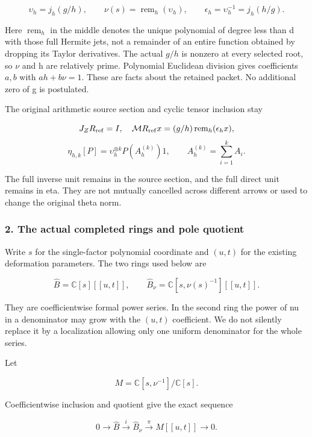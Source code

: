 \[
\upsilon_h=j_h(g/h),\qquad
\nu(s)=\operatorname{rem}_h(\upsilon_h),\qquad
\epsilon_h=\upsilon_h^{-1}=j_h(h/g).
\tag{UG2}
\]

Here \(\operatorname{rem}_h\) in the middle denotes the unique polynomial of degree less than d with those full Hermite jets, not a remainder of an entire function obtained by dropping its Taylor derivatives. The actual \(g/h\) is nonzero at every selected root, so \(\nu\) and h are relatively prime. Polynomial Euclidean division gives coefficients \(a,b\) with \(a h+b\nu=1\). These are facts about the retained packet. No additional zero of g is postulated.

The original arithmetic source section and cyclic tensor inclusion stay

\[
J_ZR_{\rm ref}=I,\quad
\mathcal M R_{\rm ref}x=(g/h)\operatorname{rem}_h(\epsilon_hx),
\] \[
\eta_{h,k}[P]=\upsilon_h^{\otimes k}
 P(A_h^{(k)})1,\qquad A_h^{(k)}=\sum_{i=1}^k A_i.
\tag{UG3}
\]

The full inverse unit remains in the source section, and the full direct unit remains in eta. They are not mutually cancelled across different arrows or used to change the original theta norm.

\subsubsection{2. The actual completed rings and pole quotient}\label{endpoint-f1_unit_gauge--the-actual-completed-rings-and-pole-quotient}

Write \(s\) for the single-factor polynomial coordinate and \((u,t)\) for the existing deformation parameters. The two rings used below are

\[
\widehat B=\mathbb C[s][[u,t]],\qquad
\widehat B_\nu=\mathbb C[s,\nu(s)^{-1}][[u,t]].
\tag{UG4}
\]

They are coefficientwise formal power series. In the second ring the power of nu in a denominator may grow with the \((u,t)\) coefficient. We do not silently replace it by a localization allowing only one uniform denominator for the whole series.

Let

\[
M=\mathbb C[s,\nu^{-1}]/\mathbb C[s].
\]

Coefficientwise inclusion and quotient give the exact sequence

\[
0\longrightarrow\widehat B\xrightarrow{i}\widehat B_\nu
 \xrightarrow{\pi} M[[u,t]]\longrightarrow0.
\tag{UG5}
\]

